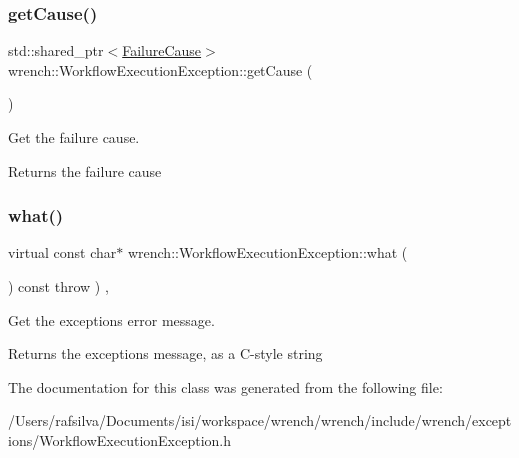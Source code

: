 \subsubsection{\texorpdfstring{get\+Cause()}{getCause()}}
{\footnotesize\ttfamily std\+::shared\+\_\+ptr$<$\hyperlink{classwrench_1_1_failure_cause}{Failure\+Cause}$>$ wrench\+::\+Workflow\+Execution\+Exception\+::get\+Cause (\begin{DoxyParamCaption}{ }\end{DoxyParamCaption})\hspace{0.3cm}{\ttfamily [inline]}}



Get the failure cause. 

\begin{DoxyReturn}{Returns}
the failure cause 
\end{DoxyReturn}
\mbox{\label{classwrench_1_1_workflow_execution_exception_a54f37236e3bfd00490835675220863c4}} 
\subsubsection{\texorpdfstring{what()}{what()}}
{\footnotesize\ttfamily virtual const char$\ast$ wrench\+::\+Workflow\+Execution\+Exception\+::what (\begin{DoxyParamCaption}{ }\end{DoxyParamCaption}) const throw  ) \hspace{0.3cm}{\ttfamily [inline]}, {\ttfamily [virtual]}}



Get the exception\textquotesingle{}s error message. 

\begin{DoxyReturn}{Returns}
the exception\textquotesingle{}s message, as a C-\/style string 
\end{DoxyReturn}


The documentation for this class was generated from the following file\+:\begin{DoxyCompactItemize}
\item 
/\+Users/rafsilva/\+Documents/isi/workspace/wrench/wrench/include/wrench/exceptions/Workflow\+Execution\+Exception.\+h\end{DoxyCompactItemize}
